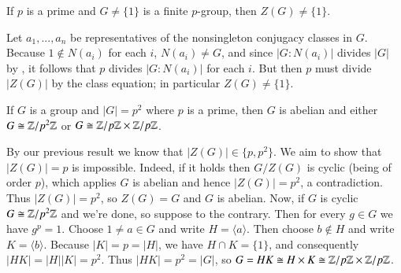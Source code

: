 \documentclass[12pt, a4paper, twoside, openright, titlepage]{book}
\begin{document}
\begin{thm}{}{}
    If $p$ is a prime and $G\neq \{1\}$ is a finite $p$-group, then $Z(G) \neq \{1\}$.
\end{thm}
\begin{proof*}{}{}
    Let $a_1,...,a_n$ be representatives of the nonsingleton conjugacy classes in $G$. Because $1 \notin N(a_i)$ for each $i$, $N(a_i) \neq G$, and since $|G:N(a_i)|$ divides $|G|$ by , it follows that $p$ divides $|G:N(a_i)|$ for each $i$. But then $p$ must divide $|Z(G)|$ by the class equation; in particular $Z(G) \neq \{1\}$.
\end{proof*}

\begin{thm}{}{}
    If $G$ is a group and $|G| = p^2$ where $p$ is a prime, then $G$ is abelian and either $G\cong \mathbb Z/p^2\mathbb Z$ or $G\cong \mathbb Z/p\mathbb Z\times \mathbb Z/p\mathbb Z$.
\end{thm}
\begin{proof*}{}{}
    By our previous result we know that $|Z(G)| \in \{p,p^2\}$. We aim to show that $|Z(G)| = p$ is impossible. Indeed, if it holds then $G/Z(G)$ is cyclic (being of order $p$), which applies $G$ is abelian and hence $|Z(G)| = p^2$, a contradiction. Thus $|Z(G)| = p^2$, so $Z(G) = G$ and $G$ is abelian. Now, if $G$ is cyclic $G \cong \mathbb Z/p^2\mathbb Z$ and we're done, so suppose to the contrary. Then for every $g \in G$ we have $g^p = 1$. Choose $1 \neq a \in G$ and write $H = \langle a \rangle$. Then choose $b \notin H$ and write $K = \langle b \rangle$. Because $|K| = p = |H|$, we have $H\cap K = \{1\}$, and consequently $|HK| = |H||K| = p^2$. Thus $|HK| = p^2 = |G|$, so $G = HK \cong H\times K\cong \mathbb Z/p\mathbb Z\times\mathbb Z/p\mathbb Z$.
\end{proof*}
\end{document}
